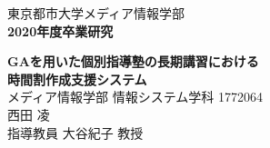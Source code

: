 \documentclass[fleqn,11pt]{jreport}
\begin{document}
\baselineskip 21.5pt

\begin{titlepage}
\vspace*{3cm}
\begin{center}
{\Large\gt 東京都市大学メディア情報学部}\\
\vspace*{0.5cm}
{\Large\bf 2020年度卒業研究}\\
\vspace{1.5cm}


{\huge\bf GAを用いた個別指導塾の長期講習における}\\
\vspace{0.5cm}
{\huge\bf 時間割作成支援システム}\\

\vspace{9cm}
{\Large メディア情報学部 情報システム学科 1772064}\\
{\Large 西田 凌}\\
\vspace*{0.5cm}
{\Large 指導教員 大谷紀子 教授}\\
\end{center}
\end{titlepage}

\tableofcontents
\cleardoublepage











%

\appendix


\end{document}

